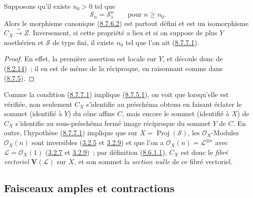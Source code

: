 \begin{corollary}[8.7.7]
\label{II.8.7.7-fr}
Supposons qu'il existe $n_0>0$ tel que
\begin{equation}
\label{II.8.7.7.1-fr}
  \mathcal{S}_n=\mathcal{S}_1^n
  \qquad\text{pour }n\geqslant n_0.
\tag{8.7.7.1}
\end{equation}
Alors le morphisme canonique \textup{(\hyperref[II.8.7.6.2-fr]{8.7.6.2})} est partout
défini et est un isomorphisme $C_X\xrightarrow{\sim}Z$. Inversement, si cette
propriété a lieu et si on suppose de plus $Y$ noethérien et $\mathcal{S}$ de
type fini, il existe $n_0$ tel que l'on ait
\textup{(\hyperref[II.8.7.7.1-fr]{8.7.7.1})}.
\end{corollary}

\begin{proof}
En effet, la première assertion est locale sur $Y$, et découle donc de
(\hyperref[II.8.2.14-fr]{8.2.14})~; il en est de même de la réciproque, en
raisonnant comme dans (\hyperref[II.8.7.5-fr]{8.7.5}).
\end{proof}

\begin{remark}[8.7.8]
\label{II.8.7.8-fr}
Comme la condition (\hyperref[II.8.7.7.1-fr]{8.7.7.1}) implique
(\hyperref[II.8.7.5.1-fr]{8.7.5.1}), on voit que lorsqu'elle est vérifiée,
non seulement $C_X$ s'identifie au préschéma obtenu en faisant éclater le
sommet (identifié à $Y$) du cône affine $C$, mais encore le sommet (identifié
à $X$) de $C_X$ s'identifie au sous-préschéma fermé image réciproque du
sommet $Y$ de $C$. En outre, l'hypothèse
(\hyperref[II.8.7.7.1-fr]{8.7.7.1}) implique que sur
$X=\operatorname{Proj}(\mathcal{S})$, les $\mathcal{O}_X$-Modules
$\mathcal{O}_X(n)$ sont inversibles (\hyperref[II.3.2.5-fr]{3.2.5} et
\hyperref[II.3.2.9-fr]{3.2.9}) et que l'on a
$\mathcal{O}_X(n)=\mathcal{L}^{\otimes n}$ avec
$\mathcal{L}=\mathcal{O}_X(1)$ (\hyperref[II.3.2.7-fr]{3.2.7} et
\hyperref[II.3.2.9-fr]{3.2.9})~; par définition
(\hyperref[II.8.6.1.1-fr]{8.6.1.1}), $C_X$ est donc le \emph{fibré vectoriel}
$\mathbf{V}(\mathcal{L})$ sur $X$, et son sommet la \emph{section nulle} de ce
fibré vectoriel.
\end{remark}

\subsection{Faisceaux amples et contractions}
\label{subsection:II.8.8-fr}

